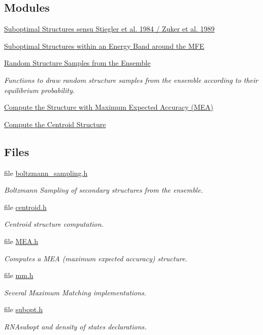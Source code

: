 \subsection*{Modules}
\begin{DoxyCompactItemize}
\item 
\hyperlink{group__subopt__zuker}{Suboptimal Structures sensu Stiegler et al. 1984 / Zuker et al. 1989}
\item 
\hyperlink{group__subopt__wuchty}{Suboptimal Structures within an Energy Band around the M\+FE}
\item 
\hyperlink{group__subopt__stochbt}{Random Structure Samples from the Ensemble}
\begin{DoxyCompactList}\small\item\em Functions to draw random structure samples from the ensemble according to their equilibrium probability. \end{DoxyCompactList}\item 
\hyperlink{group__mea__fold}{Compute the Structure with Maximum Expected Accuracy (\+M\+E\+A)}
\item 
\hyperlink{group__centroid__fold}{Compute the Centroid Structure}
\end{DoxyCompactItemize}
\subsection*{Files}
\begin{DoxyCompactItemize}
\item 
file \hyperlink{boltzmann__sampling_8h}{boltzmann\+\_\+sampling.\+h}
\begin{DoxyCompactList}\small\item\em Boltzmann Sampling of secondary structures from the ensemble. \end{DoxyCompactList}\item 
file \hyperlink{centroid_8h}{centroid.\+h}
\begin{DoxyCompactList}\small\item\em Centroid structure computation. \end{DoxyCompactList}\item 
file \hyperlink{MEA_8h}{M\+E\+A.\+h}
\begin{DoxyCompactList}\small\item\em Computes a M\+EA (maximum expected accuracy) structure. \end{DoxyCompactList}\item 
file \hyperlink{mm_8h}{mm.\+h}
\begin{DoxyCompactList}\small\item\em Several Maximum Matching implementations. \end{DoxyCompactList}\item 
file \hyperlink{subopt_8h}{subopt.\+h}
\begin{DoxyCompactList}\small\item\em R\+N\+Asubopt and density of states declarations. \end{DoxyCompactList}\end{DoxyCompactItemize}
